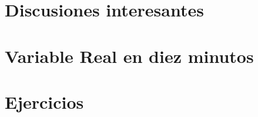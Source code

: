 \documentclass[palatino]{apuntes}
\begin{document}
\appendix

\chapter{Discusiones interesantes}
\label{chap:Discusiones}


\chapter{Variable Real en diez minutos}
\label{chap:Resumen}


\chapter{Ejercicios}
\label{chap:Ejercicios}


\nocite{terence10,folland99}

{}
\printindex
\end{document}
